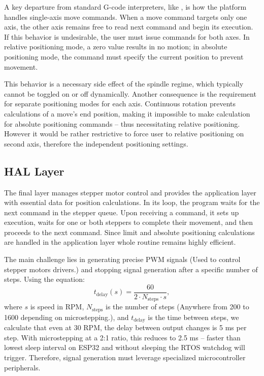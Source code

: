 A key departure from standard G-code interpreters, like \cite{duet}, is how the platform handles single-axis move commands.
When a move command targets only one axis, the other axis remains free to read next command and begin its execution.
If this behavior is undesirable, the user must issue commands for both axes.
In relative positioning mode, a zero value results in no motion; in absolute positioning mode, the command must specify the current position to prevent movement.

This behavior is a necessary side effect of the spindle regime, which typically cannot be toggled on or off dynamically.
Another consequence is the requirement for separate positioning modes for each axis.
Continuous rotation prevents calculations of a move’s end position, making it impossible to make calculation for absolute positioning commands -- thus necessitating relative positioning.
However it would be rather restrictive to force user to relative positioning on second axis, therefore the independent positioning settings.




\subsection{HAL Layer}


The final layer manages stepper motor control and provides the application layer with essential data for position calculations.
In its loop, the program waits for the next command in the stepper queue.
Upon receiving a command, it sets up execution, waits for one or both steppers to complete their movement, and then proceeds to the next command.
Since limit and absolute positioning calculations are handled in the application layer whole routine remains highly efficient.

The main challenge lies in generating precise PWM signals (Used to control stepper motors drivers.) and stopping signal generation after a specific number of steps.
Using the equation:
%
\begin{equation}
  t_{\mathrm{delay}}(s) = \frac{60}{2\cdot N_{\mathrm{steps}} \cdot s},
  \label{eq:delay}
\end{equation}
%
where $s$ is speed in RPM, $N_{\mathrm{steps}}$ is the number of steps (Anywhere from 200 to 1600 depending on microstepping.), and $t_{\mathrm{delay}}$ is the time between steps, we calculate that even at 30 RPM, the delay between output changes is 5 ms per step.
With microstepping at a 2:1 ratio, this reduces to 2.5 ms -- faster than lowest sleep interval on ESP32 and without sleeping the RTOS watchdog will trigger.
Therefore, signal generation must leverage specialized microcontroller peripherals.

